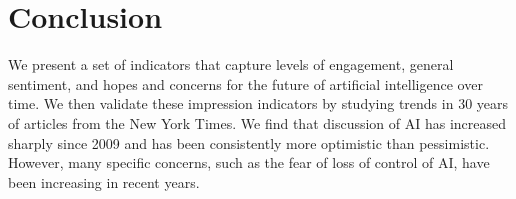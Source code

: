 \documentclass[letterpaper]{article}
\begin{document}
\section{Conclusion}
We present a set of indicators that capture levels of engagement, general sentiment, and hopes and concerns for the future of artificial intelligence over time. We then validate these impression indicators by studying trends in 30 years of articles from the New York Times. We find that discussion of AI has increased sharply since 2009 and has been consistently more optimistic than pessimistic. However, many specific concerns, such as the fear of loss of control of AI, have been increasing in recent years. 





\end{document}
